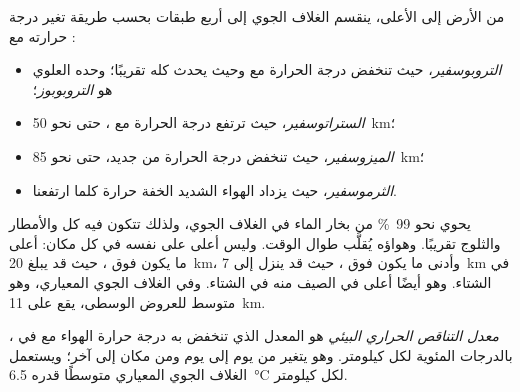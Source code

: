 \begin{definition}\label{def:g8:the-atmosphere:layers}
من الأرض إلى الأعلى، ينقسم الغلاف الجوي إلى أربع طبقات بحسب طريقة تغير
درجة حرارته مع :
\begin{itemize}
  \item \emph{التروبوسفير}، حيث تنخفض درجة الحرارة مع
         وحيث يحدث  كله تقريبًا؛ وحده العلوي هو
        \emph{التروبوبوز}؛
  \item \emph{الستراتوسفير}، حيث ترتفع درجة الحرارة مع
        ، حتى نحو \qty{50}{km}؛
  \item \emph{الميزوسفير}، حيث تنخفض درجة الحرارة من
        جديد، حتى نحو \qty{85}{km}؛
  \item \emph{الثرموسفير}، حيث يزداد الهواء الشديد الخفة
        حرارة كلما ارتفعنا.
\end{itemize}
\end{definition}

يحوي  نحو 99~\% من بخار الماء في الغلاف الجوي، ولذلك تتكون فيه
كل  والأمطار والثلوج تقريبًا. وهواؤه يُقلَّب طوال الوقت. وليس أعلى
 على  نفسه في كل مكان:  أعلى ما يكون فوق
، حيث قد يبلغ \qty{20}{km}، وأدنى ما يكون فوق ، حيث قد
ينزل إلى \qty{7}{km} في الشتاء. وهو أيضًا أعلى في الصيف منه في الشتاء. وفي
الغلاف الجوي المعياري، وهو متوسط للعروض الوسطى، يقع على  \qty{11}{km}.

\begin{definition}\label{def:g8:the-atmosphere:lapse-rate}
\emph{معدل التناقص الحراري البيئي} هو
المعدل الذي تنخفض به درجة حرارة الهواء مع  في ، بالدرجات
المئوية لكل كيلومتر. وهو يتغير من يوم إلى يوم ومن مكان إلى آخر؛ ويستعمل
الغلاف الجوي المعياري متوسطًا قدره \qty{6.5}{\degreeCelsius} لكل
كيلومتر.
\end{definition}

